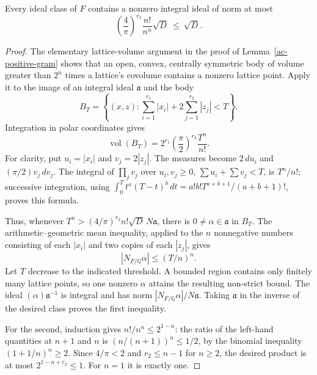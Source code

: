 \begin{lemma}\label{sl-small-ideal}
Every ideal class of $F$ contains a nonzero integral ideal of norm
at most
\[
          \left(\frac4\pi\right)^{r_2}
                 \frac{n!}{n^n}\sqrt D
             \ \le\ \sqrt D .
             \tag{SL2}
\]
\end{lemma}
\begin{proof}
The elementary lattice-volume argument in the proof of
Lemma~\ref{ac-positive-gram} shows that an open, convex,
centrally symmetric body of volume greater than $2^n$ times a
lattice's covolume contains a nonzero lattice point.
Apply it to the image of an integral ideal $\mathfrak a$ and
the body
\[
 B_T=\left\{(x,z):
       \sum_{i=1}^{r_1}|x_i|+
                  2\sum_{j=1}^{r_2}|z_j|<T\right\}.
\]
Integration in polar coordinates gives
\[
       \operatorname{vol}(B_T)
             =2^{r_1}\left(\frac\pi2\right)^{r_2}
                         \frac{T^n}{n!}.
                         \tag{SL3}
\]
For clarity, put $u_i=|x_i|$ and $v_j=2|z_j|$.
The measures become $2\,du_i$ and $(\pi/2)v_j\,dv_j$.
The integral of $\prod_jv_j$ over
$u_i,v_j\ge0$, $\sum u_i+\sum v_j<T$, is $T^n/n!$;
successive integration, using
$\int_0^T t^a(T-t)^b\,dt=a!b!T^{a+b+1}/(a+b+1)!$,
proves this formula.

Thus, whenever
$T^n>(4/\pi)^{r_2}n!\sqrt D\,N\mathfrak a$, there is
$0\ne\alpha\in\mathfrak a$ in $B_T$.  The arithmetic--geometric
mean inequality, applied to the $n$ nonnegative numbers
consisting of each $|x_i|$ and two copies of each $|z_j|$, gives
\[
        |N_{F/\mathbb Q}\alpha|
              \le(T/n)^n .
\]
Let $T$ decrease to the indicated threshold.  A bounded region
contains only finitely many lattice points, so one nonzero
$\alpha$ attains the resulting non-strict bound.
The ideal $(\alpha)\mathfrak a^{-1}$ is integral and has norm
$|N_{F/\mathbb Q}\alpha|/N\mathfrak a$.  Taking $\mathfrak a$
in the inverse of the desired class proves the first inequality.

For the second, induction gives $n!/n^n\le2^{1-n}$:
the ratio of the left-hand quantities at $n+1$ and $n$ is
$(n/(n+1))^n\le1/2$, by the binomial inequality
$(1+1/n)^n\ge2$.  Since $4/\pi<2$ and
$r_2\le n-1$ for $n\ge2$, the desired product is at most
$2^{1-n+r_2}\le1$.  For $n=1$ it is exactly one.
\end{proof}

